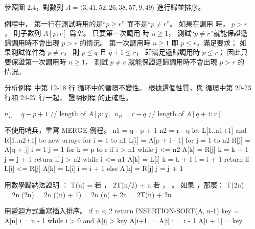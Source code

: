 \startsection[
  title={Designing algorithms},
]

\startEXERCISE
參照圖 2.4，對數列 $A=\langle 3,41,52,26,38,57,9,49\rangle$ 進行歸並排序。
\stopEXERCISE
\startANSWER
\externalfigure[output/e2_3_1-1]
\stopANSWER

\startEXERCISE
{} 例程中，
第一行在測試時用的是“\If $p\ge r$” 而不是“\If $p\ne r$”。
如果在調用  時， $p>r$，
則子數列 $A[p:r]$ 爲空。
只要第一次調用  時 $n\ge 1$，
測試“\If $p\ne r$”就能保證遞歸調用時不會出現 $p>r$ 的情況。
\stopEXERCISE
\startANSWER
第一次調用時 $n\ge 1$ 即 $p\le r$，滿足要求；
如果測試條件為 $p\ne r$，
則 $p\le q$ 且 $q+1\le r$，
即滿足遞歸調用時 $p\le r$；
因此只要保證第一次調用時 $n\ge 1$，
測試 $p\ne r$ 就能保證遞歸調用時不會出現 $p>r$ 的情況。
\stopANSWER

\startEXERCISE
分析例程  中第 12-18 行 \While 循环中的循環不變性。
根據這個性質，與 \While 循環中第 20-23 行和 24-27 行一起，
證明例程  的正確性。

\startCLRSCODE
{}
$n_L = q - p + 1$	// length of $A[p:q]$
$n_R = r - q$		// length of $A[q + 1 : r]$
\stopCLRSCODE
\stopEXERCISE
\startANSWER
\stopANSWER

\startEXERCISE
不使用哨兵，重寫 MERGE 例程。
\stopEXERCISE
\startANSWER
\startCLRS
n1 = q - p + 1
n2 = r - q
let L[1..n1+1] and R[1..n2+1] be new arrays
for i = 1 to n1
	L[i] = A[p + i - 1]
for j = 1 to n2
	R[j] = A[q + j]
i = 1
j = 1
for k = p to r
	if i > n1
		while j <= n2
			A[k] = R[j]
			k = k + 1
			j = j + 1
		return
	if j > n2
		while i <= n1
			A[k] = L[i]
			k = k + 1
			i = i + 1
		return
	if L[i] <= R[j]
		A[k] = L[i]
		i = i + 1
	else A[k] = R[j]
		j = j + 1
\stopCLRS
\stopANSWER

\startEXERCISE
用數學歸納法證明 ：
\startformula
T(n) = \startmathcases
{}		\NC 若 ， \NR
\NC 2T(n/2) + n	\NC 若 ， 。 \NR
\stopmathcases
\stopformula
\stopEXERCISE
\startANSWER
如果 ，那麼：
\startformula\startalign
\NC T(2n)	\NC = 2n \lg(2n) \NR
\NC		\NC = 2n (\lg(n) + 1) \NR
\NC		\NC = 2n \lg(n) + 2n \NR
\NC		\NC = 2T(n) + 2n \NR
\stopalign\stopformula
\stopANSWER

\startEXERCISE
用遞迴方式重寫插入排序。
\stopEXERCISE
\startANSWER
{}
\startCLRS
if n < 2
	return
INSERTION-SORT(A, n-1)
key = A[n]
i = n - 1
while i > 0 and A[i] > key
	A[i+1] = A[i]
	i = i - 1
A[i + 1] = key
\stopCLRS

